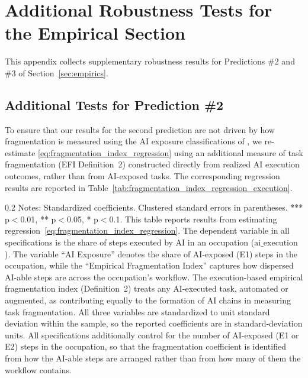\section{Additional Robustness Tests for the Empirical Section}
\label{app:additional_robustness}

This appendix collects supplementary robustness results for Predictions \#2 and \#3 of Section~\ref{sec:empirics}.


\subsection{Additional Tests for Prediction \#2}
\label{app:additional_robustness_pred2}
To ensure that our results for the second prediction are not driven by how fragmentation is measured using the AI exposure classifications of \citet{eloundou2023gpts}, we re-estimate \eqref{eq:fragmentation_index_regression} using an additional measure of task fragmentation (EFI Definition~2) constructed directly from realized AI execution outcomes, rather than from AI-exposed tasks.
The corresponding regression results are reported in Table~\ref{tab:fragmentation_index_regression_execution}.

\begin{table}[!t]
    \caption{Role of AI-able Task Fragmentation in Determining AI Execution Outcomes (Execution-Based Empirical Fragmentation Measure)}
    \label{tab:fragmentation_index_regression_execution}
    \footnotesize
    \centering
    
    \begin{minipage}{1\linewidth}
\begin{spacing}{0.2}
{\fontsize{9.5pt}{10pt}\selectfont Notes: Standardized coefficients. Clustered standard errors in parentheses. *** p$<$0.01, ** p$<$0.05, * p$<$0.1.
This table reports results from estimating regression~\eqref{eq:fragmentation_index_regression}.
The dependent variable in all specifications is the share of steps executed by AI in an occupation ($\text{ai\_execution}$).
The variable ``AI Exposure'' denotes the share of AI-exposed (E1) steps in the occupation, while the ``Empirical Fragmentation Index'' captures how dispersed AI-able steps are across the occupation's workflow.
The execution-based empirical fragmentation index (Definition~2) treats any AI-executed task, automated or augmented, as contributing equally to the formation of AI chains in measuring task fragmentation.
All three variables are standardized to unit standard deviation within the sample, so the reported coefficients are in standard-deviation units. All specifications additionally control for the number of AI-exposed (E1 or E2) steps in the occupation, so that the fragmentation coefficient is identified from how the AI-able steps are arranged rather than from how many of them the workflow contains.}
\end{spacing}
\end{minipage}\end{table}

